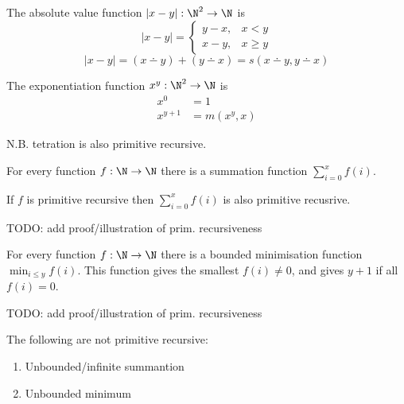 \documentclass{article}
\begin{document}
\begin{theorem}
    The absolute value function \(\left|x-y\right|:\N^2\to\N\) is
    \begin{equation*}
        \left|x-y\right| = \begin{cases}
            y-x  , & x < y \\
            x-y, & x \ge y
        \end{cases}
    \end{equation*}
    \[
        \left|x-y\right| = \left( x \dotminus y \right) + \left( y \dotminus x \right)
        = s\left( x \dotminus y, y \dotminus x \right)
    \]
\end{theorem}
\begin{theorem}
    The exponentiation function \(x^y:\N^2\to\N\) is
    \begin{align*}
            x^0 &= 1 \\
            x^{y+1} &= m(x^y, x)
    \end{align*}
    
    N.B. tetration is also primitive recursive.
\end{theorem}
\begin{theorem}
    For every function \(f:\N\to\N\) there is a summation function \(\sum_{i=0}^x f(i)\).
\end{theorem}
\begin{theorem}
    If \(f\) is primitive recursive then \(\sum_{i=0}^x f(i)\) is
    also primitive recusrive.
    
    TODO: add proof/illustration of prim. recursiveness
\end{theorem}
\begin{theorem}
    For every function \(f:\N\to\N\) there is a
    bounded minimisation function \(\min_{i\le y} f(i)\).
    This function gives the smallest \(f(i) \ne 0\),
    and gives \(y+1\) if all \(f(i) = 0\).

    TODO: add proof/illustration of prim. recursiveness
\end{theorem}
\begin{note}
    The following are not primitive recursive:
    \begin{enumerate}
        \item Unbounded/infinite summantion
        \item Unbounded minimum
    \end{enumerate}
\end{note}
\end{document}
